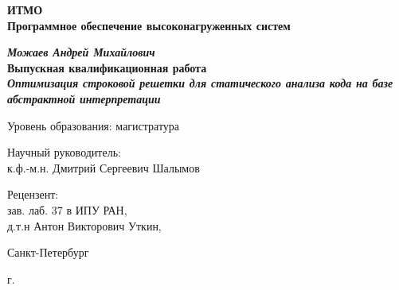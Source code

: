 \begin{titlepage}
\begin{center}

\textbf{ИТМО}\\
\textbf{Программное обеспечение высоконагруженных систем}


\vspace{35mm}

\textbf{\textit{\large Можаев Андрей Михайлович}} \\[8mm]
\textbf{\large Выпускная квалификационная работа}\\[3mm]
\textbf{\textit{\large Оптимизация строковой решетки для статического анализа кода на базе абстрактной интерпретации}}

\vspace{20mm}
Уровень образования: магистратура\\


\begin{flushright}
\begin{minipage}[t]{0.65\textwidth}
{Научный руководитель:} \\
к.ф.-м.н. Дмитрий Сергеевич Шалымов
\vspace{10mm}

{Рецензент:} \\
зав. лаб. 37 в ИПУ РАН,\\
д.т.н Антон Викторович Уткин, 
\end{minipage}
\end{flushright}

\vfill

{Санкт-Петербург}
\par{\the\year{} г.}
\end{center}
\end{titlepage}
\restoregeometry
\addtocounter{page}{1}
